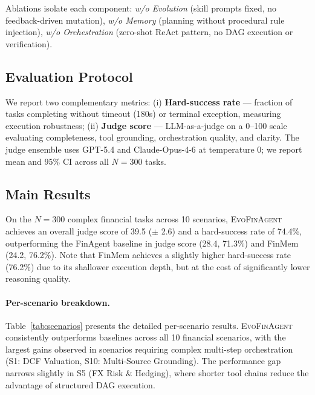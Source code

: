\documentclass{article}
\begin{document}
Ablations isolate each component: \emph{w/o Evolution} (skill prompts fixed, no feedback-driven mutation), \emph{w/o Memory} (planning without procedural rule injection), \emph{w/o Orchestration} (zero-shot ReAct pattern, no DAG execution or verification).

\subsection{Evaluation Protocol}
We report two complementary metrics: (i) \textbf{Hard-success rate} — fraction of tasks completing without timeout (180s) or terminal exception, measuring execution robustness; (ii) \textbf{Judge score} — LLM-as-a-judge on a 0--100 scale evaluating completeness, tool grounding, orchestration quality, and clarity. The judge ensemble uses GPT-5.4 and Claude-Opus-4-6 at temperature 0; we report mean and 95\% CI across all $N=300$ tasks.

\subsection{Main Results}
On the $N=300$ complex financial tasks across 10 scenarios, \textsc{EvoFinAgent} achieves an overall judge score of 39.5 ($\pm$ 2.6) and a hard-success rate of 74.4\%, outperforming the FinAgent baseline in judge score (28.4, 71.3\%) and FinMem (24.2, 76.2\%). Note that FinMem achieves a slightly higher hard-success rate (76.2\%) due to its shallower execution depth, but at the cost of significantly lower reasoning quality.

\paragraph{Per-scenario breakdown.}
Table~\ref{tab:scenarios} presents the detailed per-scenario results. \textsc{EvoFinAgent} consistently outperforms baselines across all 10 financial scenarios, with the largest gains observed in scenarios requiring complex multi-step orchestration (S1: DCF Valuation, S10: Multi-Source Grounding). The performance gap narrows slightly in S5 (FX Risk \& Hedging), where shorter tool chains reduce the advantage of structured DAG execution.
\end{document}

